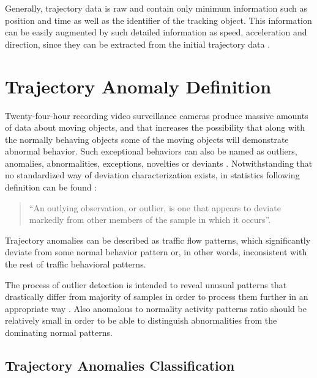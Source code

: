 Generally, trajectory data is raw and contain only minimum information such as position and time as well as the identifier of the tracking object. This information can be easily augmented by such detailed information as speed, acceleration and direction, since they can be extracted from the initial trajectory data \cite{article:12_dssto_mot}.

\section{Trajectory Anomaly Definition}

Twenty-four-hour recording video surveillance cameras produce massive amounts of data about moving objects, and that increases the possibility that along with the normally behaving objects some of the moving objects will demonstrate abnormal behavior. Such exceptional behaviors can also be named as outliers, anomalies, abnormalities, exceptions, novelties or deviants \cite{article:11_eod_hdd}\cite{article:15_survey_ad}. Notwithstanding that no standardized way of deviation characterization exists, in statistics following definition can be found \cite{article:13_pdoos}:
\begin{quote}
	``An outlying observation, or outlier, is one that appears to deviate markedly from other members of the sample in which it occurs''.
\end{quote}

Trajectory anomalies can be described as traffic flow patterns, which significantly deviate from some normal behavior pattern or, in other words, inconsistent with the rest of traffic behavioral patterns.
 
The process of outlier detection is intended to reveal unusual patterns that drastically differ from majority of samples in order to process them further in an appropriate way \cite{article:11_eod_hdd}. Also anomalous to normality activity patterns ratio should be relatively small in order to be able to distinguish abnormalities from the dominating normal patterns.

\subsection{Trajectory Anomalies Classification}

